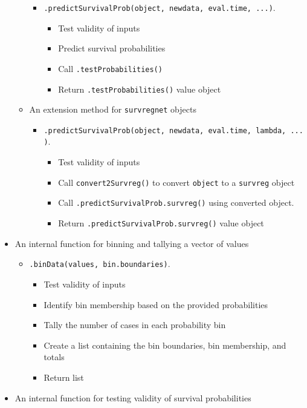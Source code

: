 \documentclass[
]{book}
\providecommand{\tightlist}{%
  \setlength{\itemsep}{0pt}\setlength{\parskip}{0pt}}
\begin{document}
\begin{itemize}
\begin{itemize}
    \begin{itemize}
    \tightlist
    \item
      \texttt{.predictSurvivalProb(object,\ newdata,\ eval.time,\ ...)}.

      \begin{itemize}
      \tightlist
      \item
        Test validity of inputs
      \item
        Predict survival probabilities
      \item
        Call \texttt{.testProbabilities()}
      \item
        Return \texttt{.testProbabilities()} value object
      \end{itemize}
    \end{itemize}
  \item
    An extension method for \texttt{survregnet} objects

    \begin{itemize}
    \tightlist
    \item
      \texttt{.predictSurvivalProb(object,\ newdata,\ eval.time,\ lambda,\ ...)}.

      \begin{itemize}
      \tightlist
      \item
        Test validity of inputs
      \item
        Call \texttt{convert2Survreg()} to convert \texttt{object} to a \texttt{survreg} object
      \item
        Call \texttt{.predictSurvivalProb.survreg()} using converted object.
      \item
        Return \texttt{.predictSurvivalProb.survreg()} value object
      \end{itemize}
    \end{itemize}
  \end{itemize}
\item
  An internal function for binning and tallying a vector of values

  \begin{itemize}
  \tightlist
  \item
    \texttt{.binData(values,\ bin.boundaries)}.

    \begin{itemize}
    \tightlist
    \item
      Test validity of inputs
    \item
      Identify bin membership based on the provided probabilities
    \item
      Tally the number of cases in each probability bin
    \item
      Create a list containing the bin boundaries, bin membership, and totals
    \item
      Return list
    \end{itemize}
  \end{itemize}
\item
  An internal function for testing validity of survival probabilities


\end{itemize}
\end{document}

